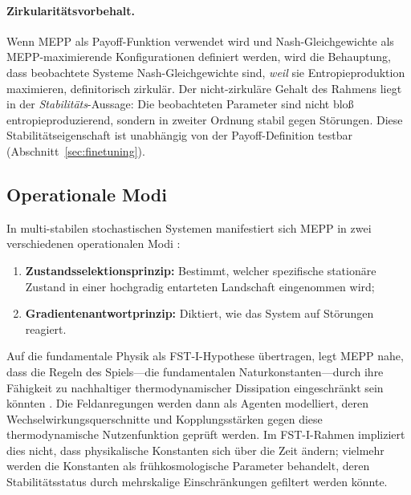 \documentclass[12pt,a4paper]{article}
\theoremstyle{remark}
\begin{document}
\paragraph{Zirkularit\"atsvorbehalt.} Wenn MEPP als Payoff-Funktion verwendet wird und Nash-Gleichgewichte als MEPP-maximierende Konfigurationen definiert werden, wird die Behauptung, dass beobachtete Systeme Nash-Gleichgewichte sind, \emph{weil} sie Entropieproduktion maximieren, definitorisch zirkul\"ar. Der nicht-zirkul\"are Gehalt des Rahmens liegt in der \emph{Stabilit\"ats}-Aussage: Die beobachteten Parameter sind nicht blo\ss{} entropieproduzierend, sondern in zweiter Ordnung stabil gegen St\"orungen. Diese Stabilit\"atseigenschaft ist unabh\"angig von der Payoff-Definition testbar (Abschnitt~\ref{sec:finetuning}).

\subsection{Operationale Modi}

In multi-stabilen stochastischen Systemen manifestiert sich MEPP in zwei verschiedenen operationalen Modi \citep{MartyushevSeleznev2006}:
\begin{enumerate}
    \item \textbf{Zustandsselektionsprinzip:} Bestimmt, welcher spezifische station\"are Zustand in einer hochgradig entarteten Landschaft eingenommen wird;
    \item \textbf{Gradientenantwortprinzip:} Diktiert, wie das System auf St\"orungen reagiert.
\end{enumerate}

Auf die fundamentale Physik als FST-I-Hypothese \"ubertragen, legt MEPP nahe, dass die Regeln des Spiels---die fundamentalen Naturkonstanten---durch ihre F\"ahigkeit zu nachhaltiger thermodynamischer Dissipation eingeschr\"ankt sein k\"onnten \citep{EntropyMaximum}. Die Feldanregungen werden dann als Agenten modelliert, deren Wechselwirkungsquerschnitte und Kopplungsst\"arken gegen diese thermodynamische Nutzenfunktion gepr\"uft werden. Im FST-I-Rahmen impliziert dies nicht, dass physikalische Konstanten sich \"uber die Zeit \"andern; vielmehr werden die Konstanten als fr\"uhkosmologische Parameter behandelt, deren Stabilit\"atsstatus durch mehrskalige Einschr\"ankungen gefiltert werden k\"onnte.
\end{document}

